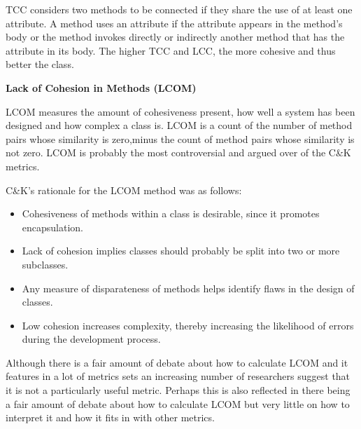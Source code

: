 TCC considers two methods to be connected if they share the  use  of  at  least  one  attribute.  A  method  uses  an  attribute if the attribute appears in the method’s body or  the  method  invokes  directly  or  indirectly  another method   that   has   the   attribute   in   its   body.   
The higher TCC and LCC, the more cohesive and thus better the class.

\textbf{Lack of Cohesion in Methods (LCOM)}

LCOM measures the amount of cohesiveness present, how well a system has been designed and how complex a class is. LCOM is a count of the number of method pairs whose similarity is zero,minus the count of method pairs whose similarity is not zero. LCOM is probably the most controversial and argued over of the C\&K metrics.

C\&K's rationale for the LCOM method was as follows:
\begin{itemize}
	\item Cohesiveness of methods within a class is desirable, since it promotes encapsulation.
	\item Lack of cohesion implies classes should probably be split into two or more subclasses.
	\item Any measure of disparateness of methods helps identify flaws in the design of classes. 
	\item Low cohesion increases complexity, thereby increasing the likelihood of errors during the development process.
\end{itemize}

Although there is a fair amount of debate about how to calculate LCOM and it features in a lot of metrics sets an increasing number of researchers suggest that it is not a particularly useful metric. Perhaps this is also reflected in there being a fair amount of debate about how to calculate LCOM but very little on how to interpret it and how it fits in with other metrics. 

